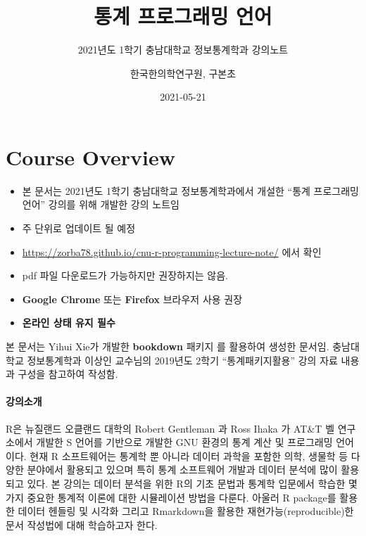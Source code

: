 \documentclass[
  11pt,
]{krantz}
\title{통계 프로그래밍 언어}
\subtitle{2021년도 1학기 충남대학교 정보통계학과 강의노트}
\author{한국한의학연구원, 구본초}
\date{2021-05-21}
\makeatletter
\providecommand{\tightlist}{%
  \setlength{\itemsep}{0pt}\setlength{\parskip}{0pt}}
\newenvironment{kframe}{%
\medskip{}
\setlength{\fboxsep}{.8em}
 \def\at@end@of@kframe{}%
 \ifinner\ifhmode%
  \def\at@end@of@kframe{\end{minipage}}%
  \begin{minipage}{\columnwidth}%
 \fi\fi%
 \def\FrameCommand##1{\hskip\@totalleftmargin \hskip-\fboxsep
 \colorbox{shadecolor}{##1}\hskip-\fboxsep
     \hskip-\linewidth \hskip-\@totalleftmargin \hskip\columnwidth}%
 \MakeFramed {\advance\hsize-\width
   \@totalleftmargin\z@ \linewidth\hsize
   \@setminipage}}%
 {\par\unskip\endMakeFramed%
 \at@end@of@kframe}
\newenvironment{rmdblock}[1]
  {
  \begin{itemize}
  \renewcommand{\labelitemi}{
    \raisebox{-.7\height}[0pt][0pt]{
      {\setkeys{Gin}{width=3em,keepaspectratio}\texttt{[image: images/\#1]}}
    }
  }
  \setlength{\fboxsep}{1em}
  \begin{kframe}
  \item
  }
  {
  \end{kframe}
  \end{itemize}
  }
\newenvironment{rmdnote}
  {\begin{rmdblock}{note}}
  {\end{rmdblock}}
\makeatother
\begin{document}
\maketitle

{
\hypersetup{linkcolor=}
\setcounter{tocdepth}{2}
\tableofcontents
}
\listoftables
\listoffigures
\hypertarget{overview}{%
\chapter*{Course Overview}\label{overview}}


\begin{rmdnote}
\begin{itemize}
\tightlist
\item
  본 문서는 2021년도 1학기 충남대학교 정보통계학과에서 개설한 ``통계 프로그래밍 언어'' 강의를 위해 개발한 강의 노트임
\item
  주 단위로 업데이트 될 예정
\item
  \url{https://zorba78.github.io/cnu-r-programming-lecture-note/} 에서 확인
\item
  pdf 파일 다운로드가 가능하지만 권장하지는 않음.
\item
  \textbf{Google Chrome} 또는 \textbf{Firefox} 브라우저 사용 권장
\item
  \textbf{온라인 상태 유지 필수}
\end{itemize}

본 문서는 Yihui Xie가 개발한 \textbf{bookdown} 패키지 \citep{xie-2016}를 활용하여 생성한 문서임. 충남대학교 정보통계학과 이상인 교수님의 2019년도 2학기 ``통계패키지활용''
강의 자료 내용과 구성을 참고하여 작성함.
\end{rmdnote}

\hypertarget{intro-lec}{%
\subsubsection*{강의소개}\label{intro-lec}}


R은 뉴질랜드 오클랜드 대학의 Robert Gentleman 과 Ross Ihaka 가 AT\&T 벨 연구소에서 개발한 S 언어를 기반으로 개발한 GNU 환경의 통계 계산 및 프로그래밍 언어이다. 현재 R 소프트웨어는 통계학 뿐 아니라 데이터 과학을 포함한 의학, 생물학 등 다양한 분야에서 활용되고 있으며 특히 통계 소프트웨어 개발과 데이터 분석에 많이 활용되고 있다. 본 강의는 데이터 분석을 위한 R의 기초 문법과 통계학 입문에서 학습한 몇 가지 중요한 통계적 이론에 대한 시뮬레이션 방법을 다룬다. 아울러 R package를 활용한 데이터 헨들링 및 시각화 그리고 Rmarkdown을 활용한 재현가능(reproducible)한 문서 작성법에 대해 학습하고자 한다.
\end{document}
